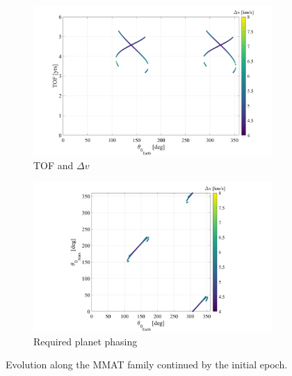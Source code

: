 \begin{figure}[H]
    \begin{subfigure}[h]{0.495\linewidth}
        \includegraphics[width=\textwidth]{figures/MMATTOF.pdf}
        \caption{TOF and $\Delta v$}
    \end{subfigure}
    \hfill
    \begin{subfigure}[h]{0.495\linewidth}
        \includegraphics[width=\textwidth]{figures/MMATtheta.pdf}
        \caption{Required planet phasing}
    \end{subfigure}
    \caption{Evolution along the MMAT family continued by the initial epoch.}
    \label{fig:MMATEvo}
\end{figure}

